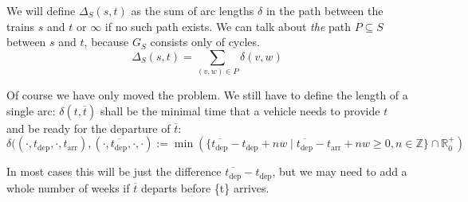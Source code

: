 \documentclass{amsart} %
\newcommand{\ol}[1]{\overline{#1}}
\begin{document}
We will define \(\Delta_S (s,t)\) as the sum of arc lengths \(\delta\)
in the path between the trains \(s\) and \(t\) or \(\infty\) if no
such path exists.  We can talk about \emph{the} path \(P \subseteq S\)
between \(s\) and \(t\), because \(G_S\) consists only of cycles.
\[\Delta_S (s,t) = \sum_{(v,w)\in P} \delta(v,w)\]



Of course we have only moved the problem.  We still have to define the length of a single arc:  \(\delta(t, \ol{t})\) shall be the minimal time that a vehicle needs to provide \(t\) and be ready for the departure of \(\ol{t}\):
\[
\delta ((\cdot, t_{\textrm{dep}}, \cdot, t_{\textrm{arr}}), (\cdot, \ol{t_{\textrm{dep}}},\cdot, \cdot)  :=
\min (\{\ol{t_{\textrm{dep}}} - t_{\textrm{dep}} + n w \mid \ol{t_{\textrm{dep}}} - t_{\textrm{arr}} + nw \geq 0, n \in \mathbb{Z}\} \cap \mathbb{R}^+_0)
\]

In most cases this will be just the difference \(\ol{t_{\textrm{dep}}} - t_{\textrm{dep}}\), but we may need to add a whole number of weeks if \(\ol{t}\) departs before \{t\} arrives.









\end{document}
